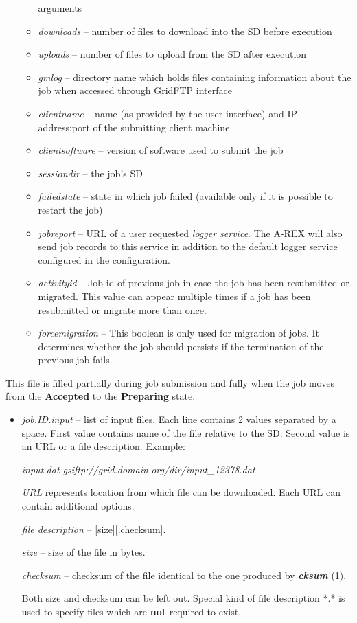 \documentclass{article}                            %
\begin{document}
\begin{itemize}
\begin{itemize}
arguments
\item \textit{downloads} -- number of files to download into the SD before
execution
\item \textit{uploads} -- number of files to upload from the SD after execution
\item \textit{gmlog} -- directory name which holds files containing information
about the job when accessed through GridFTP interface
\item \textit{clientname} -- name (as provided by the user interface) and
IP address:port of the submitting client machine
\item \textit{clientsoftware} -- version of software used to submit the job
\item \textit{sessiondir} -- the job's SD
\item \textit{failedstate} -- state in which job failed (available only if
it is possible to restart the job)
\item \textit{jobreport} -- URL of a user requested \emph{logger service}.
The A-REX will also send job records to this service in addition to
the default logger service configured in the configuration.
\item \textit{activityid} -- Job-id of previous job in case the job has been 
resubmitted or migrated. This value can appear multiple times if a job has been 
resubmitted or migrate more than once.
\item \textit{forcemigration} -- This boolean is only used for migration of jobs.
It determines whether the job should persists if the termination of the previous 
job fails.
\end{itemize}
\end{itemize}

This file is filled partially during job submission and fully when
the job moves from the \textbf{Accepted} to the \textbf{Preparing}
state.

\begin{itemize}
\item \textit{job.ID.input} -- list of input files. Each line contains 2
values separated by a space. First value contains name of the file
relative to the SD. Second value is an URL or a file description.
Example:


\hspace*{1cm}\textit{input.dat gsiftp://grid.domain.org/dir/input\_12378.dat}

\emph{URL} represents location from which file can be downloaded.
Each URL can contain additional options.

\textit{file description} -- {[}size]{[}.checksum].

\hspace*{1cm}\textit{size} -- size of the file in bytes.

\hspace*{1cm}\textit{checksum} -- checksum of the file identical to
the one produced by \textbf{\textit{cksum}} (1).

Both size and checksum can be left out. Special kind of file description
{*}.{*} is used to specify files which are \textbf{not} required to
exist.
\end{itemize}
\end{document}
